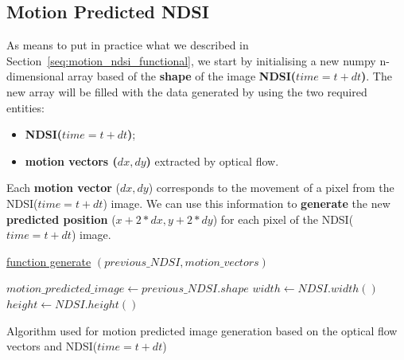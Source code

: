 \documentclass[12pt, a4paper]{report}
\begin{document}

	\subsection{Motion Predicted NDSI}
	\label{seq:motion_ndsi_implementation}
	
	\par As means to put in practice what we described in Section~\ref{seq:motion_ndsi_functional}, we start by initialising a new numpy n-dimensional array based of the \textbf{shape} of the image \textbf{NDSI(\(time=t+dt\))}. The new array will be filled with the data generated by using the two required entities:
	
	\begin{itemize}
		\item \textbf{NDSI(\(time=t+dt\))};
		\item \textbf{motion vectors (\(dx, dy\))} extracted by optical flow.
	\end{itemize}
	
	\par Each \textbf{motion vector} (\(dx, dy\)) corresponds to the movement of a pixel from the NDSI(\(time=t+dt\)) image. We can use this information to \textbf{generate} the new \textbf{predicted position} (\(x + 2*dx, y + 2*dy\)) for each pixel of the NDSI(\(time=t+dt\)) image.
	
	
	\begin{algorithm}
			
			\underline{function generate} $(previous\_NDSI, motion\_vectors)$\;
			
			$motion\_predicted\_image \gets previous\_NDSI.shape$\;
			$width \gets NDSI.width()$\;
			$height \gets NDSI.height()$\;
			
			\;

			\caption{Algorithm used for motion predicted image generation based on the optical flow vectors and NDSI(\(time=t+dt\))}
			\label{algo:change}
	\end{algorithm}
	
\end{document}

